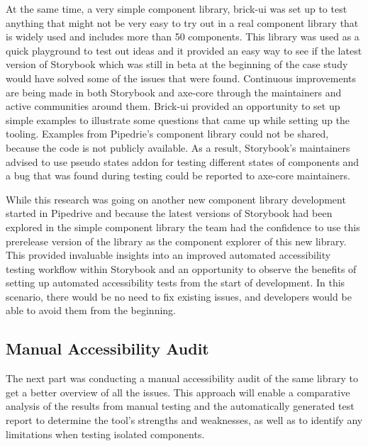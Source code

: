 \documentclass{master_thesis}
\begin{document}
At the same time, a very simple component library, brick-ui was set up to test anything that might not be very easy to try out in a real component library that is widely used and includes more than 50 components. This library was used as a quick playground to test out ideas and it provided an easy way to see if the latest version of Storybook which was still in beta at the beginning of the case study would have solved some of the issues that were found. Continuous improvements are being made in both  Storybook and axe-core through the maintainers and active communities around them. Brick-ui provided an opportunity to set up simple examples to illustrate some questions that came up while setting up the tooling. Examples from Pipedrie's component library could not be shared, because the code is not publicly available. As a result, Storybook's maintainers advised to use pseudo states addon for testing different states of components and a bug that was found during testing could be reported to axe-core maintainers.

While this research was going on another new component library development started in Pipedrive and because the latest versions of Storybook had been explored in the simple component library the team had the confidence to use this prerelease version of the library as the component explorer of this new library. This provided invaluable insights into an improved automated accessibility testing workflow within Storybook and an opportunity to observe the benefits of setting up automated accessibility tests from the start of development. In this scenario, there would be no need to fix existing issues, and developers would be able to avoid them from the beginning.

\subsection{Manual Accessibility Audit}

The next part was conducting a manual accessibility audit of the same library to get a better overview of all the issues. This approach will enable a comparative analysis of the results from manual testing and the automatically generated test report to determine the tool's strengths and weaknesses, as well as to identify any limitations when testing isolated components.
\end{document}
